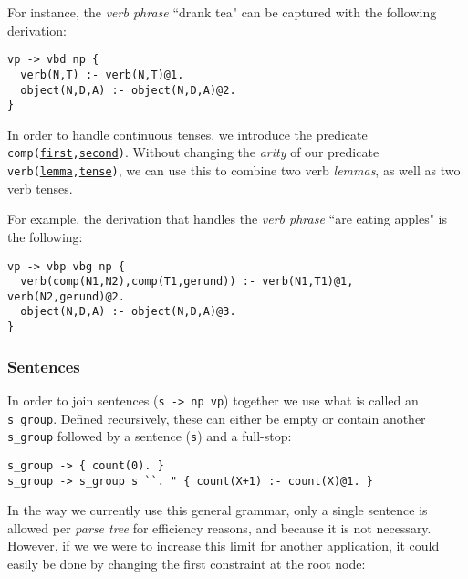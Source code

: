 For instance, the \textit{verb phrase} ``drank tea" can be captured with the following derivation:

\begin{displayquote}
\begin{lstlisting}
vp -> vbd np {
  verb(N,T) :- verb(N,T)@1.
  object(N,D,A) :- object(N,D,A)@2.
}
\end{lstlisting}
\end{displayquote}

In order to handle continuous tenses, we introduce the predicate \texttt{comp(\underline{first},\underline{second})}. Without changing the \textit{arity} of our predicate \texttt{verb(\underline{lemma},\underline{tense})}, we can use this to combine two verb \textit{lemmas}, as well as two verb tenses.

For example, the derivation that handles the \textit{verb phrase} ``are eating apples" is the following:

\begin{displayquote}
\begin{lstlisting}
vp -> vbp vbg np {
  verb(comp(N1,N2),comp(T1,gerund)) :- verb(N1,T1)@1, verb(N2,gerund)@2.
  object(N,D,A) :- object(N,D,A)@3.
}
\end{lstlisting}
\end{displayquote}

\subsubsection{Sentences}

In order to join sentences (\texttt{s -> np vp}) together we use what is called an \texttt{s\_group}. Defined recursively, these can either be empty or contain another \texttt{s\_group} followed by a sentence (\texttt{s}) and a full-stop:

\begin{displayquote}
\begin{lstlisting}
s_group -> { count(0). }
s_group -> s_group s ``. " { count(X+1) :- count(X)@1. }
\end{lstlisting}
\end{displayquote}

In the way we currently use this general grammar, only a single sentence is allowed per \textit{parse tree} for efficiency reasons, and because it is not necessary. However, if we we were to increase this limit for another application, it could easily be done by changing the first constraint at the root node:

